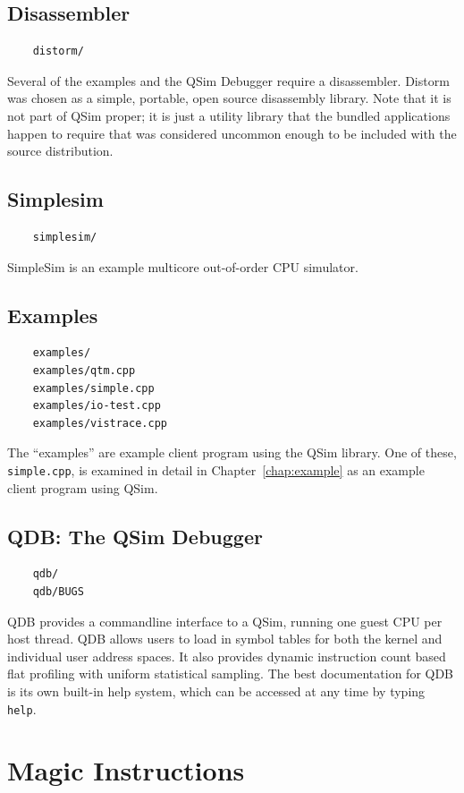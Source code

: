 \documentclass[letterpaper, 10pt]{book}
\begin{document}
\subsection{Disassembler}
\begin{verbatim}
    distorm/
\end{verbatim}
Several of the examples and the QSim Debugger require a disassembler. Distorm 
was chosen as a simple, portable, open source disassembly library. Note that it
is not part of QSim proper; it is just a utility library that the bundled
applications happen to require that was considered uncommon enough to be
included with the source distribution.

\subsection{Simplesim}
\begin{verbatim}
    simplesim/
\end{verbatim}
SimpleSim is an example multicore out-of-order CPU simulator.

\subsection{Examples}
\begin{verbatim}
    examples/
    examples/qtm.cpp
    examples/simple.cpp
    examples/io-test.cpp
    examples/vistrace.cpp
\end{verbatim}
The ``examples'' are example client program using the QSim library. One of
these, \texttt{simple.cpp}, is examined in detail in Chapter~\ref{chap:example} 
as an example client program using QSim.

\subsection{QDB: The QSim Debugger}
\begin{verbatim}
    qdb/
    qdb/BUGS
\end{verbatim}
QDB provides a commandline interface to a QSim, running one guest CPU per host
thread. QDB allows users to load in symbol tables for both the kernel and
individual user address spaces. It also provides dynamic instruction count
based flat profiling with uniform statistical sampling. The best documentation
for QDB is its own built-in help system, which can be accessed at any time by
typing \texttt{help}.

\section{Magic Instructions} \label{sec:magic}
\end{document}
